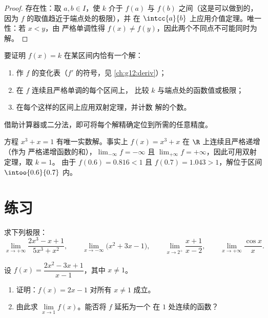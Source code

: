 \begin{proof}
存在性：取 $a, b \in I$，使 $k$ 介于 $f(a)$ 与 $f(b)$ 之间（这是可以做到的，
因为 $f$ 的取值趋近于端点处的极限），并
在 $\intcc{a}{b}$ 上应用介值定理。唯一性：若 $x < y$，由
严格单调性得 $f(x) \neq f(y)$，因此两个不同点不可能同时为
解。
\end{proof}

\begin{method}[用双射定理求解 $f(x) = k$]\label{met:g12:limcont:bijection}
要证明 $f(x) = k$ 在某区间内恰有一个解：
\begin{enumerate}
  \item 作 $f$ 的变化表（$f'$ 的符号，见
        \cref{ch:g12:deriv}）；
  \item 在 $f$ 连续且严格单调的每个区间上，
        比较 $k$ 与端点处的函数值或极限；
  \item 在每个这样的区间上应用双射定理，并计数
        解的个数。
\end{enumerate}
借助计算器或二分法，即可将每个解精确定位到所需的任意精度。
\end{method}

\begin{example}\label{ex:g12:limcont:cubic}
方程 $x^3 + x = 1$ 有唯一实数解。事实上
$f(x) = x^3 + x$ 在 $\R$ 上连续且严格递增（作为
严格递增函数的和），$\lim_{-\infty} f = -\infty$ 且
$\lim_{+\infty} f = +\infty$，因此可用双射定理，取 $k = 1$。
由于 $f(0.6) = 0.816 < 1$ 且 $f(0.7) = 1.043 > 1$，解位于区间
$\intoo{0.6}{0.7}$ 内。
\end{example}

\section{练习}

\begin{exercise}[$\star$]\label{exo:g12:limcont:1}
求下列极限：
\[
\lim_{x\to+\infty} \frac{2x^3 - x + 1}{5x^3 + x^2}, \qquad
\lim_{x\to-\infty} \bigl(x^2 + 3x - 1\bigr), \qquad
\lim_{x\to 2^+} \frac{x+1}{x-2}, \qquad
\lim_{x\to+\infty} \frac{\cos x}{x}.
\]
\end{exercise}

\begin{exercise}[$\star$]\label{exo:g12:limcont:2}
设 $f(x) = \dfrac{2x^2 - 3x + 1}{x - 1}$，其中 $x \neq 1$。
\begin{enumerate}
  \item 证明：$f(x) = 2x - 1$ 对所有 $x \neq 1$ 成立。
  \item 由此求 $\lim\limits_{x \to 1} f(x)$。能否将 $f$ 延拓为一个
        在 $1$ 处连续的函数？
\end{enumerate}
\end{exercise}

